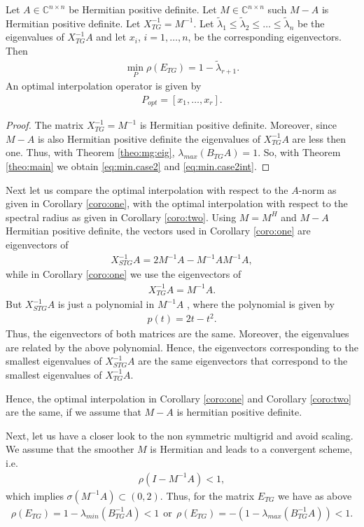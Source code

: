 \documentclass[final]{siamltex}
\newcommand{\beqo}{\begin{eqnarray*}}
\newcommand{\beq}{\begin{eqnarray}}
\newcommand{\eeqo}{\end{eqnarray*}}
\newcommand{\eeq}{\end{eqnarray}}
\numberwithin{equation}{section}
\newcommand{\inCnn}{\in \mathbb{C}^{n \times n}}
\begin{document}
\begin{corollary} \label{coro:two}
Let  $A\inCnn$  be Hermitian positive definite. Let $ M \inCnn$ such $M - A$ is
Hermitian positive definite.
Let $X_{TG}^{-1} =  M^{-1}$.   
 Let $
\tilde \lambda_1 \leq \tilde \lambda_2 \leq \ldots \leq  \tilde \lambda_n $
be the  eigenvalues of $X_{TG}^{-1}A$  and let $x_i$, $i = 1, \ldots, n$, be
the corresponding eigenvectors. Then
\beq \label{eq:min.case2}
\min_{P}\rho(E_{TG}) = 1 - \tilde \lambda_{r+1}.
\eeq
An optimal interpolation operator is given by 
\beq  \label{eq:min.case2int}
P_{opt} = [x_{1}, \ldots , x_r].
\eeq
\end{corollary}
\begin{proof}
The matrix $X_{TG}^{-1} = M^{-1}$ is Hermitian positive definite. Moreover,
since $M - A$ is also Hermitian positive definite the eigenvalues of
$X_{TG}^{-1}A$ are less then  one. Thus, with Theorem \ref{theo:mg:eig},
$\lambda_{max}(B_{TG}A) = 1$.  So, with  Theorem \ref{theo:main}  we obtain
\eqref{eq:min.case2} and \eqref{eq:min.case2int}.
\end{proof}

Next let us compare the optimal interpolation with respect to the $A$-norm as
given in Corollary \ref{coro:one}, with  the optimal interpolation with respect
to the spectral radius as given in Corollary \ref{coro:two}. Using $M=M^H$ and
$M - A$ Hermitian positive definite, the vectors used in  Corollary
\ref{coro:one}
are  eigenvectors of
\beqo
X^{-1}_{STG}A = 2M^{-1}A - M^{-1}AM^{-1}A,
\eeqo
while in Corollary \ref{coro:one} we use  the eigenvectors of
\beqo
X^{-1}_{TG}A = M^{-1}A.
\eeqo
But $X^{-1}_{STG}A$ is just a polynomial in $M^{-1}A$ , where   the polynomial
is given by
\beq \label{eq:pol}
p(t) = 2t - t^2.
\eeq
Thus, the eigenvectors of both matrices are the same. Moreover, the
eigenvalues are  related
by   the above polynomial. Hence, the eigenvectors corresponding  to the
smallest eigenvalues of
$X^{-1}_{STG}A$  are the same   eigenvectors that correspond to the smallest
eigenvalues of $X^{-1}_{TG}A$.

Hence, the optimal interpolation in Corollary \ref{coro:one}  and Corollary
\ref{coro:two} are the same, if we assume that $M - A$ is hermitian positive
definite.

Next, let us have  a closer look to the non symmetric multigrid and avoid
scaling. We assume  that
the smoother $M$ is Hermitian  and  leads to a convergent scheme, i.e.
\beq  \label{eq:smoother:con:}
\rho(I - M^{-1}A) < 1, 
\eeq
which implies $\sigma(M^{-1}A) \subset (0,2).$ Thus, for the matrix $E_{TG}$
we have as above
\beqo
\rho(E_{TG}) = 1 - \lambda_{min}(B_{TG}^{-1}A) < 1 
\ \ \mbox{or} \ \
\rho(E_{TG}) = -(1 - \lambda_{max}(B_{TG}^{-1}A)) < 1.
\eeqo
\end{document}
